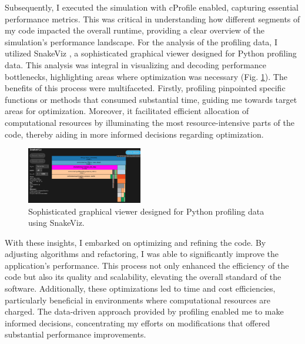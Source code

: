 Subsequently, I executed the simulation with cProfile enabled, capturing essential performance metrics. This was critical in understanding how different segments of my code impacted the overall runtime, providing a clear overview of the simulation's performance landscape. For the analysis of the profiling data, I utilized SnakeViz \cite{snakeviz}, a sophisticated graphical viewer designed for Python profiling data. This analysis was integral in visualizing and decoding performance bottlenecks, highlighting areas where optimization was necessary (Fig. \ref{fig:snake}). The benefits of this process were multifaceted. Firstly, profiling pinpointed specific functions or methods that consumed substantial time, guiding me towards target areas for optimization. Moreover, it facilitated efficient allocation of computational resources by illuminating the most resource-intensive parts of the code, thereby aiding in more informed decisions regarding optimization.
\\

\begin{figure}
    \centering
    \includegraphics[width=0.45\textwidth]{Figures/final_report/Snake_prof.png}
    \caption{Sophisticated graphical viewer designed for Python profiling data using SnakeViz.}
    \label{fig:snake}
\end{figure}

With these insights, I embarked on optimizing and refining the code. By adjusting algorithms and refactoring, I was able to significantly improve the application’s performance. This process not only enhanced the efficiency of the code but also its quality and scalability, elevating the overall standard of the software. Additionally, these optimizations led to time and cost efficiencies, particularly beneficial in environments where computational resources are charged. The data-driven approach provided by profiling enabled me to make informed decisions, concentrating my efforts on modifications that offered substantial performance improvements.